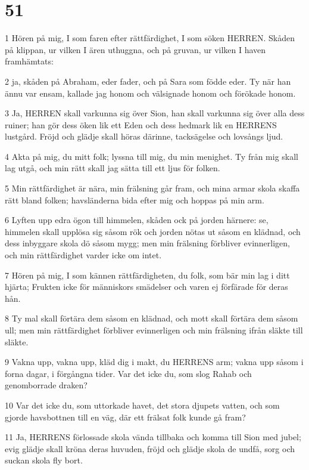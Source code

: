 \chapter{51}

\par 1 Hören på mig, I som faren efter rättfärdighet, I som söken HERREN. Skåden på klippan, ur vilken I ären uthuggna, och på gruvan, ur vilken I haven framhämtats:
\par 2 ja, skåden på Abraham, eder fader, och på Sara som födde eder. Ty när han ännu var ensam, kallade jag honom och välsignade honom och förökade honom.
\par 3 Ja, HERREN skall varkunna sig över Sion, han skall varkunna sig över alla dess ruiner; han gör dess öken lik ett Eden och dess hedmark lik en HERRENS lustgård. Fröjd och glädje skall höras därinne, tacksägelse och lovsångs ljud.
\par 4 Akta på mig, du mitt folk; lyssna till mig, du min menighet. Ty från mig skall lag utgå, och min rätt skall jag sätta till ett ljus för folken.
\par 5 Min rättfärdighet är nära, min frälsning går fram, och mina armar skola skaffa rätt bland folken; havsländerna bida efter mig och hoppas på min arm.
\par 6 Lyften upp edra ögon till himmelen, skåden ock på jorden härnere: se, himmelen skall upplösa sig såsom rök och jorden nötas ut såsom en klädnad, och dess inbyggare skola dö såsom mygg; men min frälsning förbliver evinnerligen, och min rättfärdighet varder icke om intet.
\par 7 Hören på mig, I som kännen rättfärdigheten, du folk, som bär min lag i ditt hjärta; Frukten icke för människors smädelser och varen ej förfärade för deras hån.
\par 8 Ty mal skall förtära dem såsom en klädnad, och mott skall förtära dem såsom ull; men min rättfärdighet förbliver evinnerligen och min frälsning ifrån släkte till släkte.
\par 9 Vakna upp, vakna upp, kläd dig i makt, du HERRENS arm; vakna upp såsom i forna dagar, i förgångna tider. Var det icke du, som slog Rahab och genomborrade draken?
\par 10 Var det icke du, som uttorkade havet, det stora djupets vatten, och som gjorde havsbottnen till en väg, där ett frälsat folk kunde gå fram?
\par 11 Ja, HERRENS förlossade skola vända tillbaka och komma till Sion med jubel; evig glädje skall kröna deras huvuden, fröjd och glädje skola de undfå, sorg och suckan skola fly bort.
